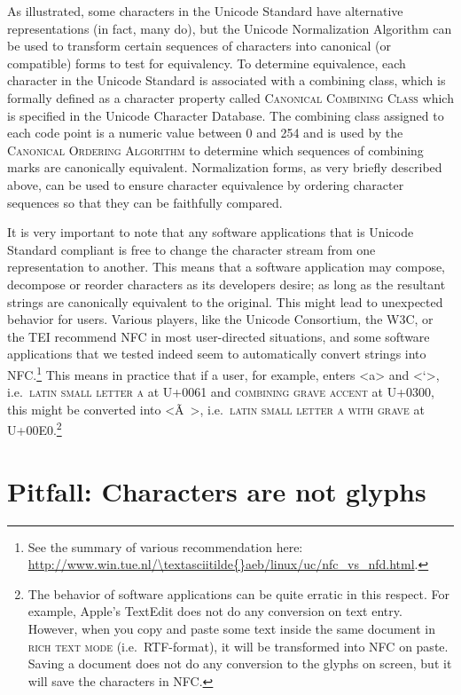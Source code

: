 As illustrated, some characters in the Unicode Standard have alternative representations (in fact, many do), but the Unicode Normalization Algorithm can be used to transform certain sequences of characters into canonical (or compatible) forms to test for equivalency. To determine equivalence, each character in the Unicode Standard is associated with a combining class, which is formally defined as a character property called \textsc{Canonical Combining Class} which is specified in the Unicode Character Database. The combining class assigned to each code point is a numeric value between 0 and 254 and is used by the \textsc{Canonical Ordering Algorithm} to determine which sequences of combining marks are canonically equivalent. Normalization forms, as very briefly described above, can be used to ensure character equivalence by ordering character sequences so that they can be faithfully compared.

It is very important to note that any software applications that is Unicode Standard compliant is free to change the character stream from one representation to another. This means that a software application may compose, decompose or reorder characters as its developers desire; as long as the resultant strings are canonically equivalent to the original. This might lead to unexpected behavior for users. Various players, like the Unicode Consortium, the W3C, or the TEI recommend NFC in most user-directed situations, and some software applications that we tested indeed seem to automatically convert strings into NFC.\footnote{See the summary of various recommendation here: \url{http://www.win.tue.nl/\textasciitilde{}aeb/linux/uc/nfc\_vs\_nfd.html}.} This means in practice that if a user, for example, enters <a> and <`>, i.e.~\textsc{latin small letter a} at U+0061 and \textsc{combining grave accent} at U+0300, this might be converted into <Ã >, i.e.~\textsc{latin small letter a with grave} at U+00E0.\footnote{The behavior of software applications can be quite erratic in this respect. For example, Apple's TextEdit does not do any conversion on text entry. However, when you copy and paste some text inside the same document in \textsc{rich text mode} (i.e.~RTF-format), it will be transformed into NFC on paste. Saving a document does not do any conversion to the glyphs on screen, but it will save the characters in NFC.}

\section{Pitfall: Characters are not glyphs}
\label{pitfall-characters-are-not-glyphs}

